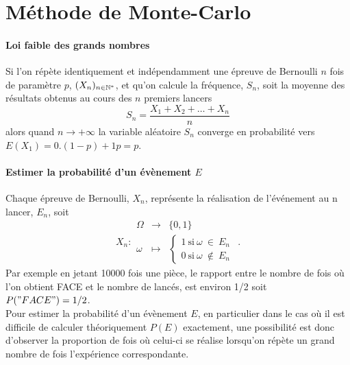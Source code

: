 \documentclass{book}
\begin{document}
\section*{Méthode de Monte-Carlo}
\paragraph{Loi faible des grands nombres}
Si l'on répète identiquement et indépendamment une épreuve de Bernoulli $n$ fois de paramètre $p$, $(X_n)_{n\in \mathbb{N}^*}$,  et qu'on 
calcule la fréquence, $S_n$, soit la moyenne des résultats obtenus au cours des $n$ premiers lancers
$$ S_n =\frac{X_1+X_2+\dots+X_n}{n}$$ 
alors quand $n \to +\infty$ la variable aléatoire $S_n$  converge en probabilité vers $E(X_1)=0.(1-p)+1p=p$.\\
\paragraph{Estimer la probabilité d'un évènement $E$} Chaque épreuve de Bernoulli, $X_n$,  représente la réalisation de l'événement au n lancer, $E_n$, soit $$
X_n:{\begin{array}{rcl}\Omega &\longrightarrow &\{0,1\}\\\omega &\longmapsto &\left\{{\begin{matrix}1\ {\mbox{si}}\ \omega\ \in \ E_n\\0\ {\mbox{si}}\ \omega\ \notin \ E_n\end{matrix}}\right.\end{array}}.$$
Par exemple en jetant 10000 fois une pièce, le rapport entre le nombre de fois où l'on obtient FACE et le nombre de lancés, est environ 1/2 soit $P("FACE") = 1/2$.\\
Pour estimer la probabilité d'un évènement $E$, en particulier dans le cas où il est difficile de calculer théoriquement  $P(E)$ exactement, une possibilité est donc d'observer la
proportion de fois où celui-ci se réalise lorsqu'on répète un grand nombre de fois
l'expérience correspondante.
\end{document}
